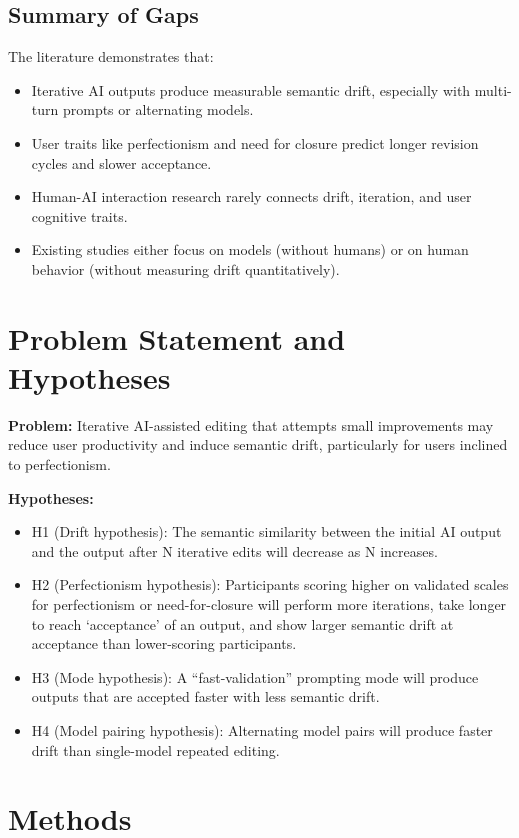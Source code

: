 \documentclass[conference]{IEEEtran} %
\begin{document}
\subsection{Summary of Gaps}
The literature demonstrates that:
\begin{itemize}
    \item Iterative AI outputs produce measurable semantic drift, especially with multi-turn prompts or alternating models.
    \item User traits like perfectionism and need for closure predict longer revision cycles and slower acceptance.
    \item Human-AI interaction research rarely connects drift, iteration, and user cognitive traits.
    \item Existing studies either focus on models (without humans) or on human behavior (without measuring drift quantitatively).
\end{itemize}

\section{Problem Statement and Hypotheses}
\textbf{Problem:} Iterative AI-assisted editing that attempts small improvements may reduce user productivity and induce semantic drift, particularly for users inclined to perfectionism.

\textbf{Hypotheses:}
\begin{itemize}
    \item H1 (Drift hypothesis): The semantic similarity between the initial AI output and the output after N iterative edits will decrease as N increases.
    \item H2 (Perfectionism hypothesis): Participants scoring higher on validated scales for perfectionism or need-for-closure will perform more iterations, take longer to reach ‘acceptance’ of an output, and show larger semantic drift at acceptance than lower-scoring participants.
    \item H3 (Mode hypothesis): A “fast-validation” prompting mode will produce outputs that are accepted faster with less semantic drift.
    \item H4 (Model pairing hypothesis): Alternating model pairs will produce faster drift than single-model repeated editing.
\end{itemize}

\section{Methods}
\end{document}
